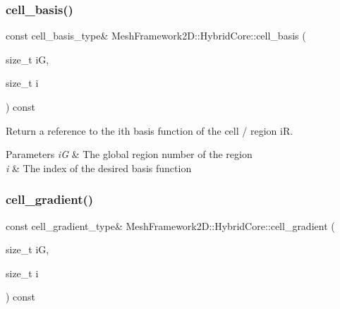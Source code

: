 \subsubsection{\texorpdfstring{cell\+\_\+basis()}{cell\_basis()}\hspace{0.1cm}{\footnotesize\ttfamily [2/2]}}
{\footnotesize\ttfamily const cell\+\_\+basis\+\_\+type\& Mesh\+Framework2\+D\+::\+Hybrid\+Core\+::cell\+\_\+basis (\begin{DoxyParamCaption}\item[{size\+\_\+t}]{iG,  }\item[{size\+\_\+t}]{i }\end{DoxyParamCaption}) const}



Return a reference to the i\textquotesingle{}th basis function of the cell / region iR. 


\begin{DoxyParams}{Parameters}
{\em iG} & The global region number of the region \\
\hline
{\em i} & The index of the desired basis function \\
\hline
\end{DoxyParams}
\mbox{\label{classMeshFramework2D_1_1HybridCore_ae2292a9a5f8fe58d9a05c104419bcc2e}} 
\subsubsection{\texorpdfstring{cell\+\_\+gradient()}{cell\_gradient()}\hspace{0.1cm}{\footnotesize\ttfamily [1/2]}}
{\footnotesize\ttfamily const cell\+\_\+gradient\+\_\+type\& Mesh\+Framework2\+D\+::\+Hybrid\+Core\+::cell\+\_\+gradient (\begin{DoxyParamCaption}\item[{size\+\_\+t}]{iG,  }\item[{size\+\_\+t}]{i }\end{DoxyParamCaption}) const}

